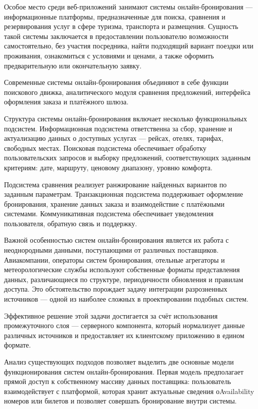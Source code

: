 \documentclass[14pt,a4paper,oneside]{extreport}
\begin{document}
Особое место среди веб-приложений занимают системы онлайн-бронирования — информационные платформы, предназначенные для поиска, сравнения и резервирования услуг в сфере туризма, транспорта и размещения. Сущность такой системы заключается в предоставлении пользователю возможности самостоятельно, без участия посредника, найти подходящий вариант поездки или проживания, ознакомиться с условиями и ценами, а также оформить предварительную или окончательную заявку.

Современные системы онлайн-бронирования объединяют в себе функции поискового движка, аналитического модуля сравнения предложений, интерфейса оформления заказа и платёжного шлюза.

Структура системы онлайн-бронирования включает несколько функциональных подсистем. Информационная подсистема ответственна за сбор, хранение и актуализацию данных о доступных услугах — рейсах, отелях, тарифах, свободных местах. Поисковая подсистема обеспечивает обработку пользовательских запросов и выборку предложений, соответствующих заданным критериям: дате, маршруту, ценовому диапазону, уровню комфорта.

Подсистема сравнения реализует ранжирование найденных вариантов по заданным параметрам. Транзакционная подсистема поддерживает оформление бронирования, хранение данных заказа и взаимодействие с платёжными системами. Коммуникативная подсистема обеспечивает уведомления пользователя, обратную связь и поддержку.

Важной особенностью систем онлайн-бронирования является их работа с неоднородными данными, поступающими от различных поставщиков. Авиакомпании, операторы систем бронирования, отельные агрегаторы и метеорологические службы используют собственные форматы представления данных, различающиеся по структуре, периодичности обновления и правилам доступа. Это обстоятельство порождает задачу интеграции разрозненных источников — одной из наиболее сложных в проектировании подобных систем.

Эффективное решение этой задачи достигается за счёт использования промежуточного слоя — серверного компонента, который нормализует данные различных источников и предоставляет их клиентскому приложению в едином формате.

Анализ существующих подходов позволяет выделить две основные модели функционирования систем онлайн-бронирования. Первая модель предполагает прямой доступ к собственному массиву данных поставщика: пользователь взаимодействует с платформой, которая хранит актуальные сведения оAvailability номеров или билетов и позволяет совершать бронирование внутри системы.
\end{document}
